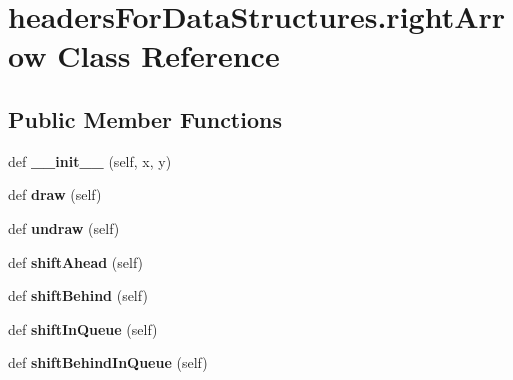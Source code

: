 \hypertarget{classheaders_for_data_structures_1_1right_arrow}{}\section{headers\+For\+Data\+Structures.\+right\+Arrow Class Reference}
\label{classheaders_for_data_structures_1_1right_arrow}
\subsection*{Public Member Functions}
\begin{DoxyCompactItemize}
\item 
\mbox{\label{classheaders_for_data_structures_1_1right_arrow_a0d53d254a151ec5db5331c8a6afd36c0}} 
def {\bfseries \+\_\+\+\_\+init\+\_\+\+\_\+} (self, x, y)
\item 
\mbox{\label{classheaders_for_data_structures_1_1right_arrow_a0ab3e6bded6c7acb0c4dc9ba61d7ac31}} 
def {\bfseries draw} (self)
\item 
\mbox{\label{classheaders_for_data_structures_1_1right_arrow_a0a5c65179b5c92ce3d79d6f1c1678b5b}} 
def {\bfseries undraw} (self)
\item 
\mbox{\label{classheaders_for_data_structures_1_1right_arrow_a3a9f5debd35ed66cc2b3a7c64397d530}} 
def {\bfseries shift\+Ahead} (self)
\item 
\mbox{\label{classheaders_for_data_structures_1_1right_arrow_a3e9d01ac5c06f2c21facde8562303d8f}} 
def {\bfseries shift\+Behind} (self)
\item 
\mbox{\label{classheaders_for_data_structures_1_1right_arrow_a70f3a761d27bd00ff60b71bd4457752d}} 
def {\bfseries shift\+In\+Queue} (self)
\item 
\mbox{\label{classheaders_for_data_structures_1_1right_arrow_a89971076429e090ee142a0ac82dd51ce}} 
def {\bfseries shift\+Behind\+In\+Queue} (self)
\end{DoxyCompactItemize}
